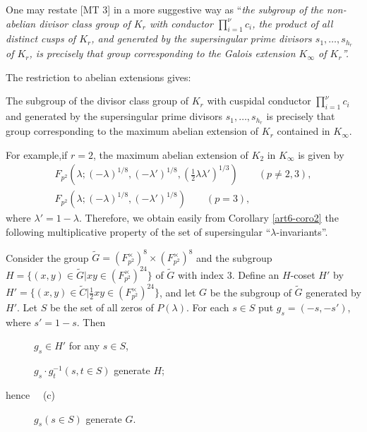 One may restate [MT 3] in a more suggestive way as ``\textit{the subgroup of the non-abelian divisor class group of $K_r$ with conductor $\prod\limits^\nu_{i=1} c_i$, the product of all distinct cusps of $K_r$, and generated by the supersingular prime divisors $s_1, \ldots, s_{h_r}$ of $K_r$, is precisely that group corresponding to the Galois extension $K_\infty$ of $K_r$''.}

The restriction to abelian extensions gives:

\begin{corollary}\label{art6-coro2}
The subgroup of the divisor class group of $K_r$ with cuspidal conductor $\prod\limits^\nu_{i=1} c_i$ and generated by the supersingular prime divisors $s_1, \ldots, s_{h_r}$ is precisely that group corresponding to the maximum abelian extension of $K_r$ contained in $K_\infty$.
\end{corollary}

For example,\pageoriginale if $r = 2$, the maximum abelian extension of $K_2$ in $K_\infty$ is given by 
\begin{gather*}
F_{p^2 } (\lambda; (-\lambda)^{1/8}, (-\lambda')^{1/8}, (\frac{1}{2} \lambda \lambda')^{1/3}) \qquad (p \neq 2, 3), \\
F_{p^2 } (\lambda; (-\lambda)^{1/8} , (-\lambda')^{1/8}) \qquad (p = 3),
\end{gather*}
where $\lambda' = 1 -\lambda$. Therefore, we obtain easily from Corollary \ref{art6-coro2} the following multiplicative property of the set of supersingular ``$\lambda$-invariants''.

\begin{corollary}[$p \neq 2,3$]\label{art6-coro3}
Consider the group $\tilde{G} = (F^\times_{p^2})^8 \times (F^\times_{p^2})^8$ and the subgroup $H= \{(x,y) \in \tilde{G} | xy \in (F^\times_{p^2})^{24} \}$ of $\tilde{G}$ with index 3. Define an $H$-coset $H'$ by $H' = \{(x,y) \in \tilde{C} | \frac{1}{2} xy \in (F^\times_{p^2})^{24}\}$, and let $G$ be the subgroup of $\tilde{G}$ generated by $H'$. Let $S$ be the set of all zeros of $P(\lambda)$. For each $s \in S$ put $g_s = (-s, -s')$, where $s' = 1 -s$. Then 
\begin{description}
\item[\quad {}] $g_s \in H'$ for any $s \in S$,

\item[\quad {}] $g_s \cdot g^{-1}_t (s, t \in S)$  generate $H$;

\item[{\rm hence ~~(c)}]  $g_s (s \in S)$ generate $G$.
\end{description}
\end{corollary}

